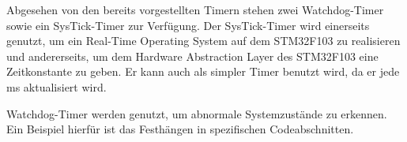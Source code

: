 \smallskip

Abgesehen von den bereits vorgestellten Timern stehen zwei Watchdog-Timer sowie ein SysTick-Timer zur Verfügung. Der SysTick-Timer wird einerseits genutzt,
um ein Real-Time Operating System auf dem STM32F103 zu realisieren und andererseits, um 
dem Hardware Abstraction Layer des STM32F103 eine Zeitkonstante zu geben. Er kann auch als simpler Timer benutzt wird, da er jede
ms aktualisiert wird.

\smallskip

Watchdog-Timer werden genutzt, um abnormale Systemzustände zu erkennen. Ein Beispiel hierfür ist das Festhängen in spezifischen Codeabschnitten.



